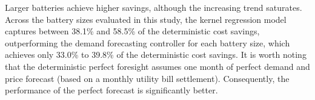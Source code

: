 \documentclass[conference]{IEEEtran}
\newcommand{\todo}[1]{\textcolor{red}{#1}} %
\begin{document}

Larger batteries achieve higher savings, although the increasing trend saturates. Across the battery sizes evaluated in this study, the kernel regression model captures between 38.1\% and 58.5\% of the deterministic cost savings, outperforming the demand forecasting controller for each battery size, which achieves only 33.0\% to 39.8\% of the deterministic cost savings. It is worth noting that the deterministic perfect foresight assumes one month of perfect demand and price forecast (based on a monthly utility bill settlement). Consequently, the performance of the perfect forecast is significantly better. 



\end{document}
